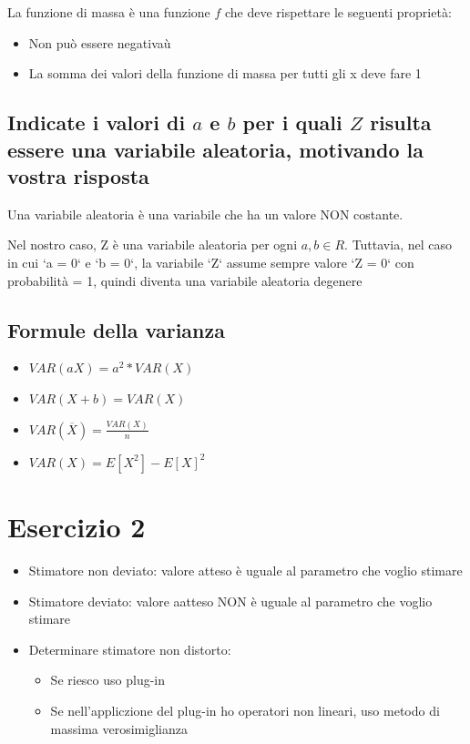 \documentclass{article}
\begin{document}
La funzione di massa è una funzione $f$ che deve rispettare le seguenti proprietà:

\begin{itemize}
    \item Non può essere negativaù
    \item La somma dei valori della funzione di massa per tutti gli x deve fare 1
\end{itemize}
\subsection*{Indicate i valori di $a$ e $b$ per i quali $Z$ risulta essere una variabile aleatoria, motivando la vostra risposta}

Una variabile aleatoria è una variabile che ha un valore NON costante.

Nel nostro caso, Z è una variabile aleatoria per ogni $a, b \in R$. Tuttavia, nel caso in cui `a = 0` e `b = 0`, la variabile `Z` assume sempre valore `Z = 0` con probabilità = 1, quindi diventa una variabile aleatoria degenere

\subsection*{Formule della varianza}

\begin{itemize}
    \item $VAR(aX) = a^2* VAR(X)$
    \item $VAR(X + b) = VAR(X)$
    \item $VAR(\overline {X}) = \frac{VAR(X)}{n}$
    \item $VAR(X) = E[X^2] - E[X]^2$
\end{itemize}

\section{Esercizio 2}

\begin{itemize}
    \item Stimatore non deviato: valore atteso è uguale al parametro che voglio stimare
    \item Stimatore deviato: valore aatteso NON è uguale al parametro che voglio stimare
    \item Determinare stimatore non distorto:
    \begin{itemize}
        \item Se riesco uso plug-in 
        \item Se nell'appliczione del plug-in ho operatori non lineari, uso metodo di massima verosimiglianza
    \end{itemize}
\end{itemize}
\end{document}
